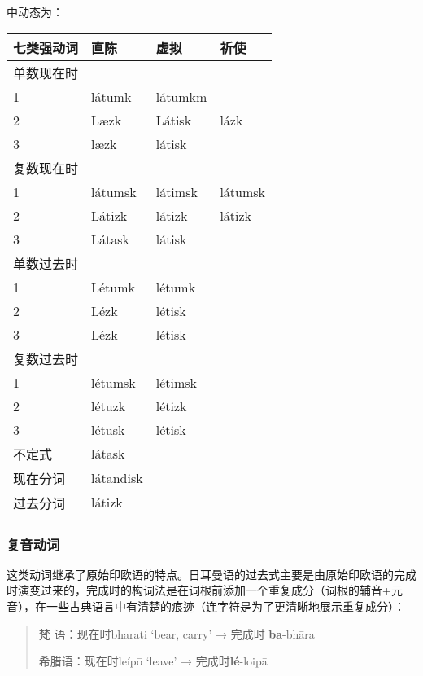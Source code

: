 中动态为：

\begin{longtable}{llll}
    \toprule
    七类强动词 & 直陈      & 虚拟    & 祈使    \\
    \midrule
    \endhead
    \bottomrule
    \endfoot
    单数现在时 &           &         &         \\
    1          & látumk    & látumkm &         \\
    2          & Læzk      & Látisk  & lázk    \\
    3          & læzk      & látisk  &         \\
    复数现在时 &           &         &         \\
    1          & látumsk   & látimsk & látumsk \\
    2          & Látizk    & látizk  & látizk  \\
    3          & Látask    & látisk  &         \\
    单数过去时 &           &         &         \\
    1          & Létumk    & létumk  &         \\
    2          & Lézk      & létisk  &         \\
    3          & Lézk      & létisk  &         \\
    复数过去时 &           &         &         \\
    1          & létumsk   & létimsk &         \\
    2          & létuzk    & létizk  &         \\
    3          & létusk    & létisk  &         \\
    不定式     & látask    &         &         \\
    现在分词   & látandisk &         &         \\
    过去分词   & látizk    &         &         \\
\end{longtable}

\subsubsection{复音动词}

这类动词继承了原始印欧语的特点。日耳曼语的过去式主要是由原始印欧语的完成时演变过来的，完成时的构词法是在词根前添加一个重复成分（词根的辅音+元音），在一些古典语言中有清楚的痕迹（连字符是为了更清晰地展示重复成分）：

\begin{quote}
    梵 语：现在时bharati `bear, carry' → 完成时 \textbf{ba}-bhāra

    希腊语：现在时leípō `leave' → 完成时\textbf{lé}-loipā
\end{quote}

